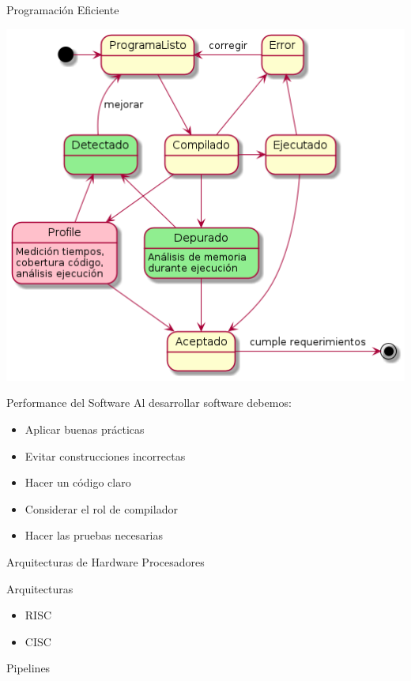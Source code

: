 \begin{frame}{Programación Eficiente}
    \begin{center}
        \includegraphics[scale=.5]{../imagenes/desarrolloSW.png}
    \end{center}
\end{frame}

\begin{frame}{Performance del Software}
    Al desarrollar software debemos:
    \begin{itemize}
        \item Aplicar buenas prácticas
        \item Evitar construcciones incorrectas
        \item Hacer un código claro
        \item Considerar el rol de compilador
        \item Hacer las pruebas necesarias
    \end{itemize}
\end{frame}

\begin{frame}{Arquitecturas de Hardware}
    Procesadores
    
    \vspace{1cm} Arquitecturas
    \begin{itemize}
        \item RISC
        \item CISC
    \end{itemize}
    \vspace{1cm}Pipelines
\end{frame}